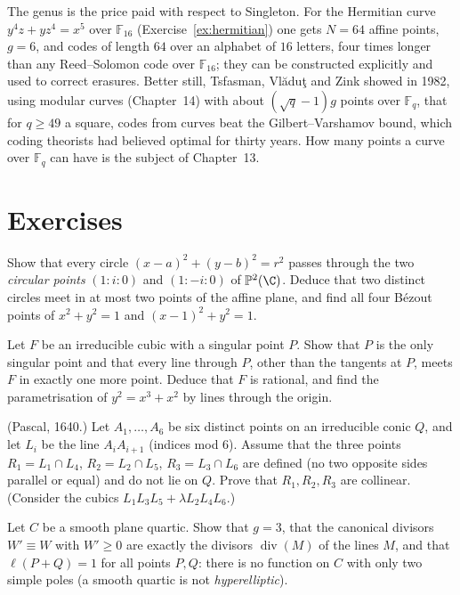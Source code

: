 The genus is the price paid with respect to Singleton. For the Hermitian curve $y^4z+yz^4=x^5$ over $\mathbb F_{16}$ (Exercise~\ref{ex:hermitian}) one
gets $N=64$ affine points, $g=6$, and codes of length $64$ over an alphabet of $16$ letters, four times longer than any Reed--Solomon code over
$\mathbb F_{16}$; they can be constructed explicitly and used to correct erasures. Better still, Tsfasman, Vl\u{a}du\c{t} and Zink showed in 1982, using modular curves
(Chapter~14) with about $(\sqrt q-1)g$ points over $\mathbb F_q$, that for $q\ge49$ a square, codes from curves beat the Gilbert--Varshamov bound, which
coding theorists had believed optimal for thirty years. How many points a curve over $\mathbb F_q$ can have is the subject of Chapter~13.

\section{Exercises}

\begin{exercise}[$\star$]\label{ex:circles}
Show that every circle $(x-a)^2+(y-b)^2=r^2$ passes through the two \emph{circular points} $(1:i:0)$ and $(1:-i:0)$ of $\mathbb P^2(\C)$. Deduce that two
distinct circles meet in at most two points of the affine plane, and find all four B\'ezout points of $x^2+y^2=1$ and $(x-1)^2+y^2=1$.
\end{exercise}

\begin{exercise}[$\star$]\label{ex:singcubic}
Let $F$ be an irreducible cubic with a singular point $P$. Show that $P$ is the only singular point and that every line through $P$, other than the
tangents at $P$, meets $F$ in exactly one more point. Deduce that $F$ is rational, and find the parametrisation of $y^2=x^3+x^2$ by lines through the
origin.
\end{exercise}

\begin{exercise}[$\star$]\label{ex:pascal}
(Pascal, 1640.) Let $A_1,\dots,A_6$ be six distinct points on an irreducible conic $Q$, and let $L_i$ be the line $A_iA_{i+1}$ (indices mod $6$). Assume
that the three points $R_1=L_1\cap L_4$, $R_2=L_2\cap L_5$, $R_3=L_3\cap L_6$ are defined (no two opposite sides parallel or equal) and do not lie on $Q$.
Prove that $R_1,R_2,R_3$ are collinear. (Consider the cubics $L_1L_3L_5+\lambda L_2L_4L_6$.)
\end{exercise}

\begin{exercise}[$\star\star$]\label{ex:quartic}
Let $C$ be a smooth plane quartic. Show that $g=3$, that the canonical divisors $W'\equiv W$ with $W'\ge0$ are exactly the divisors $\operatorname{div}(M)$ of the
lines $M$, and that $\ell(P+Q)=1$ for all points $P,Q$: there is no function on $C$ with only two simple poles (a smooth quartic is not
\emph{hyperelliptic}).
\end{exercise}


